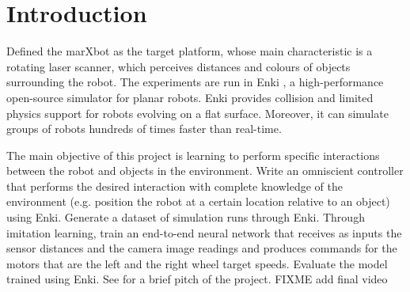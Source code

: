 \section{Introduction}
Defined the marXbot \cite{bonani2010marxbot} as the target platform, whose main characteristic is a rotating laser 
scanner, which perceives distances and colours of objects surrounding the robot. The experiments are run in Enki  
\cite{enki}, a high-performance open-source simulator for planar robots. Enki provides collision and limited physics 
support for robots evolving on a flat surface. 
Moreover, it can simulate groups of robots hundreds of times faster than real-time.

The main objective of this project is learning to perform specific interactions between the robot and objects in the 
environment.
Write an omniscient controller that performs the desired interaction with complete knowledge of the environment (e.g. 
position the robot at a certain location relative to an object) using Enki.
Generate a dataset of simulation runs through Enki. 
Through imitation learning, train an end-to-end neural network that receives as inputs the sensor distances and the 
camera image readings and produces commands for the motors that are the left and the right wheel target speeds.
Evaluate the model trained using Enki.
See \cite{pitch} for a brief pitch of the project. FIXME add final video
